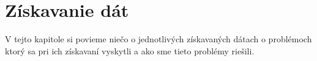 \chapter{Získavanie dát}

V tejto kapitole si povieme niečo o jednotlivých získavaných dátach o problémoch ktorý sa pri ich získavaní vyskytli a ako sme tieto problémy riešili.